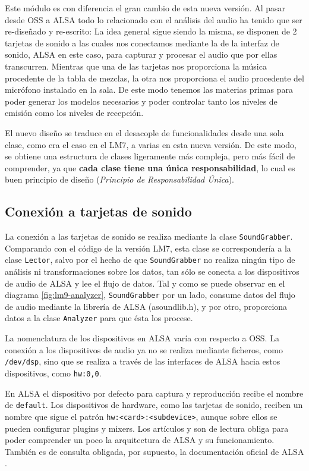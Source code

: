 Este módulo es con diferencia el gran cambio de esta nueva versión. Al pasar desde \acrshort{OSS} a \acrshort{ALSA} todo lo relacionado con el análisis del audio ha tenido que ser re-diseñado y re-escrito: La idea general sigue siendo la misma, se disponen de 2 tarjetas de sonido a las cuales nos conectamos mediante la  de la interfaz de sonido, \acrshort{ALSA} en este caso, para capturar y procesar el audio que por ellas transcurren. Mientras que una de las tarjetas nos proporciona la música procedente de la tabla de mezclas, la otra nos proporciona el audio procedente del micrófono instalado en la sala. De este modo tenemos las materias primas para poder generar los modelos necesarios y poder controlar tanto los niveles de emisión como los niveles de recepción.

El nuevo diseño se traduce en el desacople de funcionalidades desde una sola clase, como era el caso en el \acrshort{LM7}, a varias en esta nueva versión. De este modo, se obtiene una estructura de clases ligeramente más compleja, pero más fácil de comprender, ya que \textbf{cada clase tiene una única responsabilidad}, lo cual es buen principio de diseño (\textit{Principio de Responsabilidad Única}).

\subsection{Conexión a tarjetas de sonido}

La conexión a las tarjetas de sonido se realiza mediante la clase \verb|SoundGrabber|. Comparando con el código de la versión \acrshort{LM7}, esta clase se correspondería a la clase \verb|Lector|, salvo por el hecho de que \verb|SoundGrabber| no realiza ningún tipo de análisis ni transformaciones sobre los datos, tan sólo se conecta a los dispositivos de audio de \acrshort{ALSA} y lee el flujo de datos. Tal y como se puede observar en el diagrama \ref{fig:lm9-analyzer}, \verb|SoundGrabber| por un lado, consume datos del flujo de audio mediante la librería de \acrshort{ALSA} (asoundlib.h), y por otro, proporciona datos a la clase \verb|Analyzer| para que ésta los procese.

La nomenclatura de los dispositivos en \acrshort{ALSA} varía con respecto a OSS. La conexión a los dispositivos de audio ya no se realiza mediante ficheros, como \verb|/dev/dsp|, sino que se realiza a través de las interfaces de \acrshort{ALSA} hacia estos dispositivos, como \verb|hw:0,0|.

\begin{shaded}
En \acrshort{ALSA} el dispositivo por defecto para captura y reproducción recibe el nombre de \verb|default|. Los dispositivos de hardware, como las tarjetas de sonido, reciben un nombre que sigue el patrón \texttt{hw:<card>:<subdevice>}, aunque sobre ellos se pueden configurar plugins y mixers. Los artículos \cite{alsa-pcm} y \cite{alsa-journal} son de lectura obliga para poder comprender un poco la arquitectura de \acrshort{ALSA} y su funcionamiento. También es de consulta obligada, por supuesto, la documentación oficial de \acrshort{ALSA} \cite{ALSA}.
\end{shaded}

